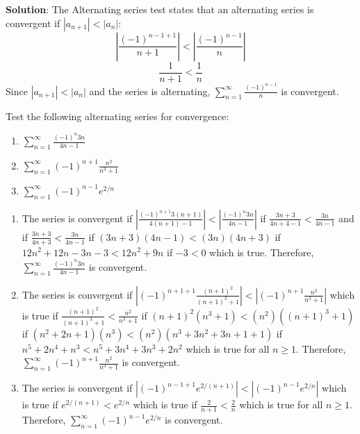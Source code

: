 \textbf{Solution}: The Alternating series test states that an alternating 
series is convergent if $|a_{n+1}| < |a_n|$:
$$\left| \frac{(-1)^{n-1+1}}{n+1} \right| < \left| \frac{(-1)^{n-1}}{n} \right|$$
$$\frac{1}{n+1} < \frac{1}{n}$$
Since $|a_{n+1}| < |a_n|$ and the series is alternating, $\sum_{n=1}^\infty 
\frac{(-1)^{n-1}}{n}$ is convergent. 

\begin{Exercise}[label=alt1]
Test the following alternating series for convergence:
\begin{enumerate}
\item $\sum_{n=1}^\infty \frac{(-1)^n 3n}{4n-1}$
\item $\sum_{n=1}^\infty (-1)^{n+1} \frac{n^2}{n^3 + 1}$
\item $\sum_{n=1}^\infty (-1)^{n-1} e^{2/n}$
\end{enumerate}
\vspace{50mm}
\end{Exercise}

\begin{Answer}[ref = alt1]
\begin{enumerate}
\item The series is convergent if $\left| \frac{(-1)^{n+1} 3(n+1)}{4(n+1)-1} 
\right| < \left| \frac{(-1)^n 3n}{4n-1} \right|$ if $\frac{3n+3}{4n+4-1} < 
\frac{3n}{4n-1}$ and if $\frac{3n+3}{4n+3} < \frac{3n}{4n-1}$ if $(3n+3)(4n-1) 
< (3n)(4n+3)$ if $12n^2 + 12n - 3n - 3 < 12n^2 + 9n$ if $-3 < 0$ which is true. 
Therefore, $\sum_{n=1}^\infty \frac{(-1)^n 3n}{4n-1}$ is convergent. 
\item The series is convergent if $\left| (-1)^{n+1+1} \frac{(n+1)^2}{(n+1)^3 
+ 1} \right| < \left| (-1)^{n+1} \frac{n^2}{n^3 + 1} \right|$ which is true if 
$\frac{(n+1)^2}{(n+1)^3 + 1} < \frac{n^2}{n^3 + 1}$ if $(n+1)^2 (n^3 + 1) < 
(n^2) ((n+1)^3+1)$ if $(n^2 + 2n + 1)(n^3) < (n^2) (n^3 + 3n^2 + 3n + 1 + 1)$ 
if $n^5 + 2n^4 + n^3 < n^5 + 3n^4 + 3n^3 + 2n^2$ which is true for all $n \geq 
1$. Therefore, $\sum_{n=1}^\infty (-1)^{n+1} \frac{n^2}{n^3 + 1}$ is convergent.
\item The series is convergent if $\left| (-1)^{n-1+1} e^{2/(n+1)} \right| < 
\left| (-1)^{n - 1} e^{2/n} \right|$ which is true if $e^{2/(n+1)} < e^{2/n}$ 
which is true if $\frac{2}{n+1} < \frac{2}{n}$ which is true for all $n \geq 1$. 
Therefore, $\sum_{n=1}^\infty (-1)^{n-1} e^{2/n}$ is convergent. 
\end{enumerate}
\end{Answer}







